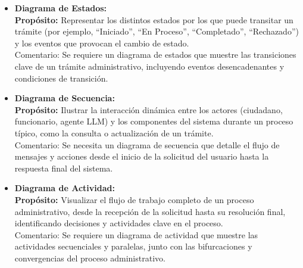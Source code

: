 
\begin{itemize}
    \item \textbf{Diagrama de Estados:} \\
    \textbf{Propósito:} Representar los distintos estados por los que puede transitar un trámite (por ejemplo, ``Iniciado'', ``En Proceso'', ``Completado'', ``Rechazado'') y los eventos que provocan el cambio de estado. \\
    Comentario: Se requiere un diagrama de estados que muestre las transiciones clave de un trámite administrativo, incluyendo eventos desencadenantes y condiciones de transición.
    \item \textbf{Diagrama de Secuencia:} \\
    \textbf{Propósito:} Ilustrar la interacción dinámica entre los actores (ciudadano, funcionario, agente LLM) y los componentes del sistema durante un proceso típico, como la consulta o actualización de un trámite. \\
    Comentario: Se necesita un diagrama de secuencia que detalle el flujo de mensajes y acciones desde el inicio de la solicitud del usuario hasta la respuesta final del sistema.


    \item \textbf{Diagrama de Actividad:} \\
    \textbf{Propósito:} Visualizar el flujo de trabajo completo de un proceso administrativo, desde la recepción de la solicitud hasta su resolución final, identificando decisiones y actividades clave en el proceso. \\
    Comentario: Se requiere un diagrama de actividad que muestre las actividades secuenciales y paralelas, junto con las bifurcaciones y convergencias del proceso administrativo.
\end{itemize}
